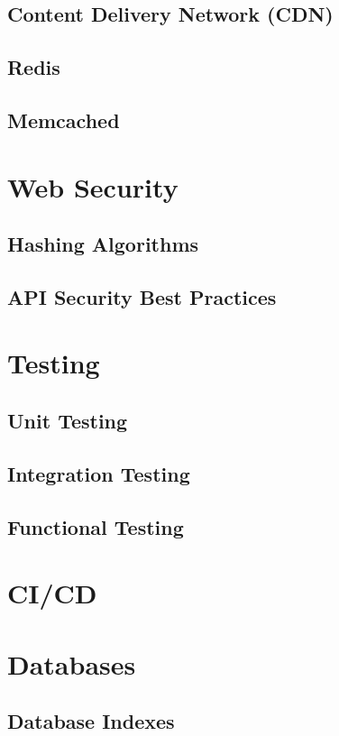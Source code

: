 \documentclass[a4paper]{article}
\begin{document}
    \subsection{Content Delivery Network (CDN)}
    \subsection{Redis}
    \subsection{Memcached}

    \newpage
    \section{Web Security}
    \subsection{Hashing Algorithms}
    \subsection{API Security Best Practices}

    \newpage
    \section{Testing}
    \subsection{Unit Testing}
    \subsection{Integration Testing}
    \subsection{Functional Testing}
    
    \newpage
    \section{CI/CD}
    
    \newpage
    \section{Databases}
    \subsection{Database Indexes}
\end{document}
